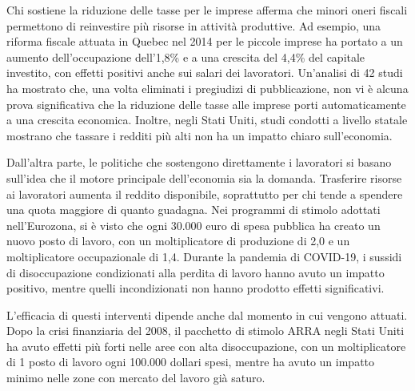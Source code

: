 \documentclass[12pt]{book} %
\begin{document}
Chi sostiene la riduzione delle tasse per le imprese afferma che minori oneri fiscali permettono di reinvestire più risorse in attività produttive. Ad esempio, una riforma fiscale attuata in Quebec nel 2014 per le piccole imprese ha portato a un aumento dell'occupazione dell'1,8\% e a una crescita del 4,4\% del capitale investito, con effetti positivi anche sui salari dei lavoratori. Un'analisi di 42 studi ha mostrato che, una volta eliminati i pregiudizi di pubblicazione, non vi è alcuna prova significativa che la riduzione delle tasse alle imprese porti automaticamente a una crescita economica. Inoltre, negli Stati Uniti, studi condotti a livello statale mostrano che tassare i redditi più alti non ha un impatto chiaro sull’economia.

Dall'altra parte, le politiche che sostengono direttamente i lavoratori si basano sull'idea che il motore principale dell'economia sia la domanda. Trasferire risorse ai lavoratori aumenta il reddito disponibile, soprattutto per chi tende a spendere una quota maggiore di quanto guadagna. Nei programmi di stimolo adottati nell'Eurozona, si è visto che ogni 30.000 euro di spesa pubblica ha creato un nuovo posto di lavoro, con un moltiplicatore di produzione di 2,0 e un moltiplicatore occupazionale di 1,4. Durante la pandemia di COVID-19, i sussidi di disoccupazione condizionati alla perdita di lavoro hanno avuto un impatto positivo, mentre quelli incondizionati non hanno prodotto effetti significativi.

L'efficacia di questi interventi dipende anche dal momento in cui vengono attuati. Dopo la crisi finanziaria del 2008, il pacchetto di stimolo ARRA negli Stati Uniti ha avuto effetti più forti nelle aree con alta disoccupazione, con un moltiplicatore di 1 posto di lavoro ogni 100.000 dollari spesi, mentre ha avuto un impatto minimo nelle zone con mercato del lavoro già saturo.
\end{document}
